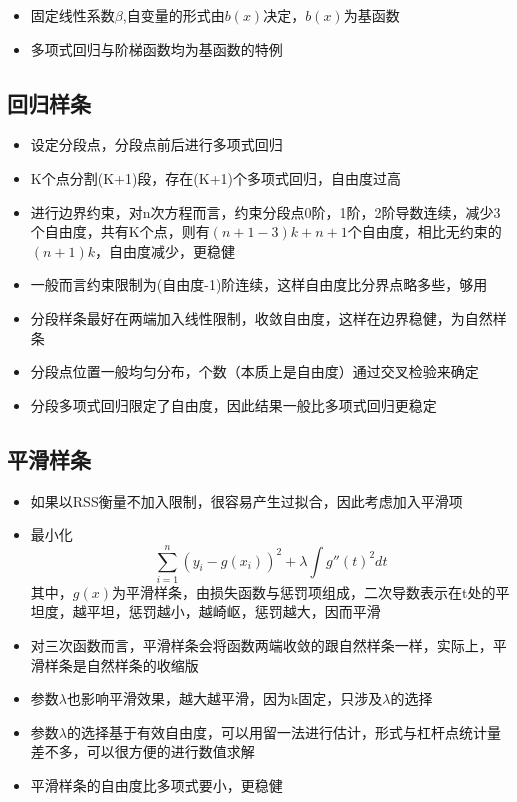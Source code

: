 \documentclass[]{book}
\providecommand{\tightlist}{%
  \setlength{\itemsep}{0pt}\setlength{\parskip}{0pt}}
\begin{document}
\begin{itemize}
\tightlist
\item
  固定线性系数\(\beta\),自变量的形式由\(b(x)\)决定，\(b(x)\)为基函数
\item
  多项式回归与阶梯函数均为基函数的特例
\end{itemize}

\subsection{回归样条}

\begin{itemize}
\tightlist
\item
  设定分段点，分段点前后进行多项式回归
\item
  K个点分割(K+1)段，存在(K+1)个多项式回归，自由度过高
\item
  进行边界约束，对n次方程而言，约束分段点0阶，1阶，2阶导数连续，减少3个自由度，共有K个点，则有\((n+1-3)k + n + 1\)个自由度，相比无约束的\((n+1)k\)，自由度减少，更稳健
\item
  一般而言约束限制为(自由度-1)阶连续，这样自由度比分界点略多些，够用
\item
  分段样条最好在两端加入线性限制，收敛自由度，这样在边界稳健，为自然样条
\item
  分段点位置一般均匀分布，个数（本质上是自由度）通过交叉检验来确定
\item
  分段多项式回归限定了自由度，因此结果一般比多项式回归更稳定
\end{itemize}

\subsection{平滑样条}

\begin{itemize}
\tightlist
\item
  如果以RSS衡量不加入限制，很容易产生过拟合，因此考虑加入平滑项
\item
  最小化 \[ \sum_{i = 1}^n (y_{i} - g(x_i))^2 + \lambda \int g''(t)^2 dt \] 其中，\(g(x)\)为平滑样条，由损失函数与惩罚项组成，二次导数表示在t处的平坦度，越平坦，惩罚越小，越崎岖，惩罚越大，因而平滑
\item
  对三次函数而言，平滑样条会将函数两端收敛的跟自然样条一样，实际上，平滑样条是自然样条的收缩版
\item
  参数\(\lambda\)也影响平滑效果，越大越平滑，因为k固定，只涉及\(\lambda\)的选择
\item
  参数\(\lambda\)的选择基于有效自由度，可以用留一法进行估计，形式与杠杆点统计量差不多，可以很方便的进行数值求解
\item
  平滑样条的自由度比多项式要小，更稳健
\end{itemize}
\end{document}
